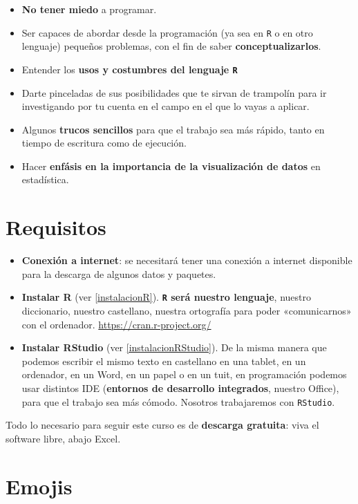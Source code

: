 \documentclass[11pt,]{book}
\providecommand{\tightlist}{%
  \setlength{\itemsep}{0pt}\setlength{\parskip}{0pt}}
\begin{document}
\begin{itemize}
\tightlist
\item
  \textbf{No tener miedo} a programar.
\item
  Ser capaces de abordar desde la programación (ya sea en \texttt{R} o en otro lenguaje) pequeños problemas, con el fin de saber \textbf{conceptualizarlos}.
\item
  Entender los \textbf{usos y costumbres del lenguaje \texttt{R}}
\item
  Darte pinceladas de sus posibilidades que te sirvan de trampolín para ir investigando por tu cuenta en el campo en el que lo vayas a aplicar.
\item
  Algunos \textbf{trucos sencillos} para que el trabajo sea más rápido, tanto en tiempo de escritura como de ejecución.
\item
  Hacer \textbf{enfásis en la importancia de la visualización de datos} en estadística.
\end{itemize}

\hypertarget{requisitos}{%
\section*{Requisitos}\label{requisitos}}


\begin{itemize}
\item
  \textbf{Conexión a internet}: se necesitará tener una conexión a internet disponible para la descarga de algunos datos y paquetes.
\item
  \textbf{Instalar R} (ver \ref{instalacionR}). \textbf{\texttt{R} será nuestro lenguaje}, nuestro diccionario, nuestro castellano, nuestra ortografía para poder «comunicarnos» con el ordenador. \url{https://cran.r-project.org/}
\item
  \textbf{Instalar RStudio} (ver \ref{instalacionRStudio}). De la misma manera que podemos escribir el mismo texto en castellano en una tablet, en un ordenador, en un Word, en un papel o en un tuit, en programación podemos usar distintos IDE (\textbf{entornos de desarrollo integrados}, nuestro Office), para que el trabajo sea más cómodo. Nosotros trabajaremos con \texttt{RStudio}.
\end{itemize}

Todo lo necesario para seguir este curso es de \textbf{descarga gratuita}: viva el software libre, abajo Excel.

\hypertarget{emojis}{%
\section*{Emojis}\label{emojis}}
\end{document}

